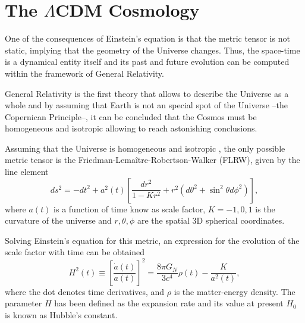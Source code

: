 \section{The $\Lambda$CDM Cosmology}
One of the consequences of Einstein's equation is that the metric tensor is not static, implying that the geometry of the Universe changes. Thus, the space-time is a dynamical entity itself and its past and future evolution can be computed within the framework of General Relativity.
\newline

General Relativity is the first theory that allows to describe the Universe as a whole and by assuming that Earth is not an special spot of the Universe --the Copernican Principle--, it can be concluded that the Cosmos must be homogeneous and isotropic allowing to reach astonishing conclusions.
\newline

Assuming that the Universe is homogeneous and isotropic \citep{2014MNRAS.440...10A,2015MNRAS.449..670A}, the only possible metric tensor is the Friedman-Lema\^itre-Robertson-Walker (FLRW), given by the line element \cite{1927ASSB...47...49L}
\begin{equation}
ds^2 = -dt^2+a^2(t)\left[\frac{dr^2}{1-Kr^2}+r^2(d\theta^2+\sin^2\theta d\phi^2)\right],
\end{equation}
where $a(t)$ is a function of time know as scale factor, $K=-1,0,1$ is the curvature of the universe and $r,\theta,\phi$ are the spatial 3D spherical coordinates.
\newline

Solving Einstein's equation for this metric, an expression for the evolution of the scale factor with time can be obtained
\begin{equation}
H^2(t)\equiv \left[\frac{\dot a(t)}{a(t)}\right]^2 = \frac{8\pi G_N}{3c^4}\rho(t) -\frac{K}{a^2(t)},
\end{equation}
where the dot denotes time derivatives, and $\rho$ is the matter-energy density. The parameter $H$ has been defined as the expansion rate and its value at present $H_0$ is known as Hubble's constant.
\newline

